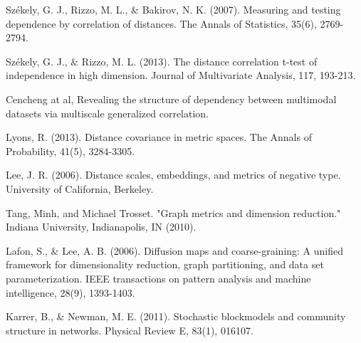 \documentclass[12pt]{article}
\theoremstyle{definition}
\begin{document}
\begin{thebibliography}{1}
	 Székely, G. J., Rizzo, M. L., $\&$ Bakirov, N. K. (2007). Measuring and testing dependence by correlation of distances. The Annals of Statistics, 35(6), 2769-2794.
	
	
	 Székely, G. J., $\&$ Rizzo, M. L. (2013). The distance correlation t-test of independence in high dimension. Journal of Multivariate Analysis, 117, 193-213.
	
	
	 Cencheng at al, Revealing the structure of dependency between multimodal datasets via multiscale generalized correlation.
	
	
	 Lyons, R. (2013). Distance covariance in metric spaces. The Annals of Probability, 41(5), 3284-3305.
	
	 Lee, J. R. (2006). Distance scales, embeddings, and metrics of negative type. University of California, Berkeley.
	
	 Tang, Minh, and Michael Trosset. "Graph metrics and dimension reduction." Indiana University, Indianapolis, IN (2010).
	
	 Lafon, S., $\&$ Lee, A. B. (2006). Diffusion maps and coarse-graining: A unified framework for dimensionality reduction, graph partitioning, and data set parameterization. IEEE transactions on pattern analysis and machine intelligence, 28(9), 1393-1403.
	
	 Karrer, B., $\&$ Newman, M. E. (2011). Stochastic blockmodels and community structure in networks. Physical Review E, 83(1), 016107.
	

	
	
\end{thebibliography}
\end{document}
